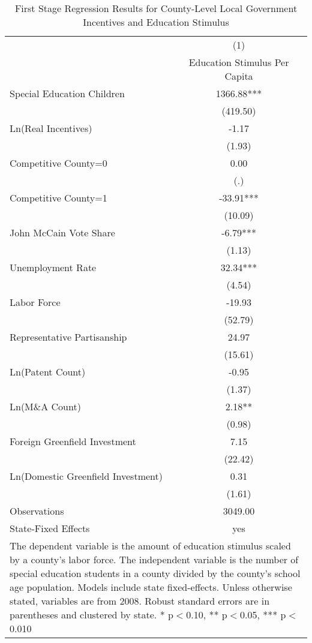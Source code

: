 \begin{table}[!htbp]\centering
\def\sym#1{\ifmmode^{#1}\else\(^{#1}\)\fi}
\caption{First Stage Regression Results for County-Level Local Government Incentives and Education Stimulus}
\begin{tabular}{l*{1}{c}}
\hline\hline
                    &\multicolumn{1}{c}{(1)}   \\
                    &Education Stimulus Per Capita   \\
\hline
Special Education Children&     1366.88***\\
                    &    (419.50)   \\
Ln(Real Incentives) &       -1.17   \\
                    &      (1.93)   \\
Competitive County=0&        0.00   \\
                    &         (.)   \\
Competitive County=1&      -33.91***\\
                    &     (10.09)   \\
John McCain Vote Share&       -6.79***\\
                    &      (1.13)   \\
Unemployment Rate   &       32.34***\\
                    &      (4.54)   \\
Labor Force         &      -19.93   \\
                    &     (52.79)   \\
Representative Partisanship&       24.97   \\
                    &     (15.61)   \\
Ln(Patent Count)    &       -0.95   \\
                    &      (1.37)   \\
Ln(M\&A Count)      &        2.18** \\
                    &      (0.98)   \\
Foreign Greenfield Investment&        7.15   \\
                    &     (22.42)   \\
Ln(Domestic Greenfield Investment)&        0.31   \\
                    &      (1.61)   \\
\hline
Observations        &     3049.00   \\
State-Fixed Effects &         yes   \\
\hline\hline
\multicolumn{2}{p{\linewidth}}{\footnotesize The dependent variable is the amount of education stimulus scaled by a county's labor force. The independent variable is the number of special education students in a county divided by the county's school age population. Models include state fixed-effects. Unless otherwise stated, variables are from 2008. Robust standard errors are in parentheses and clustered by state. * p$<$0.10, ** p$<$0.05, *** p$<$0.010}\\
\end{tabular}
\end{table}
